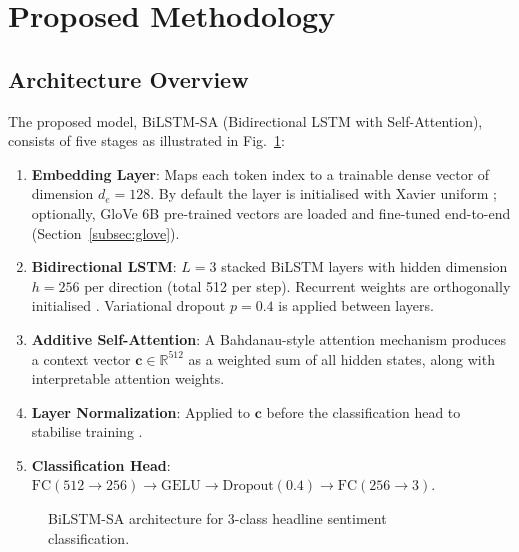 \documentclass[conference]{IEEEtran}
\begin{document}
\section{Proposed Methodology}
\label{sec:method}

\subsection{Architecture Overview}
The proposed model, BiLSTM-SA (Bidirectional LSTM with Self-Attention),
consists of five stages as illustrated in Fig.~\ref{fig:arch}:

\begin{enumerate}
  \item \textbf{Embedding Layer}: Maps each token index to a trainable
        dense vector of dimension $d_e = 128$. By default the layer is
        initialised with Xavier uniform \cite{glorot2010xavier}; optionally,
        GloVe 6B pre-trained vectors \cite{pennington2014glove} are loaded
        and fine-tuned end-to-end (Section~\ref{subsec:glove}).
  \item \textbf{Bidirectional LSTM}: $L = 3$ stacked BiLSTM layers with
        hidden dimension $h = 256$ per direction (total 512 per step).
        Recurrent weights are orthogonally initialised
        \cite{saxe2013orthogonal}. Variational dropout $p = 0.4$ is
        applied between layers.
  \item \textbf{Additive Self-Attention}: A Bahdanau-style attention
        mechanism \cite{bahdanau2015attention} produces a context vector
        $\mathbf{c} \in \mathbb{R}^{512}$ as a weighted sum of all hidden
        states, along with interpretable attention weights.
  \item \textbf{Layer Normalization}: Applied to $\mathbf{c}$ before the
        classification head to stabilise training \cite{ba2016layernorm}.
  \item \textbf{Classification Head}: $\text{FC}(512 \rightarrow 256)
        \rightarrow \text{GELU} \rightarrow \text{Dropout}(0.4) \rightarrow
        \text{FC}(256 \rightarrow 3)$.
\end{enumerate}

\begin{figure}[h]
\centering
{}
\caption{BiLSTM-SA architecture for 3-class headline sentiment classification.}
\label{fig:arch}
\end{figure}
\end{document}
